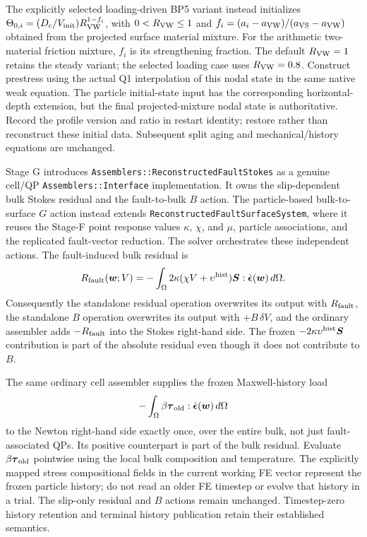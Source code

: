 \documentclass[11pt]{article}
\begin{document}
The explicitly selected loading-driven BP5 variant instead initializes
$\Theta_{0,i}=(D_c/V_{\rm init})R_{\rm VW}^{1-f_i}$, with $0<R_{\rm VW}\leq1$
and $f_i=(a_i-a_{\rm VW})/(a_{\rm VS}-a_{\rm VW})$ obtained from the projected
surface material mixture. For the arithmetic two-material friction mixture,
$f_i$ is its strengthening fraction. The default $R_{\rm VW}=1$ retains the
steady variant; the selected loading case uses $R_{\rm VW}=0.8$.
Construct prestress using the actual Q1 interpolation of this nodal state in
the same native weak equation. The particle initial-state input has the
corresponding horizontal-depth extension, but the final projected-mixture
nodal state is authoritative. Record the profile version and ratio in restart
identity; restore rather than reconstruct these initial data. Subsequent
split aging and mechanical/history equations are unchanged.

Stage G introduces \texttt{Assemblers::ReconstructedFaultStokes} as a genuine
cell/QP \texttt{Assemblers::Interface} implementation.  It owns the
slip-dependent bulk Stokes residual and the fault-to-bulk $B$ action.  The
particle-based bulk-to-surface $G$ action instead extends
\texttt{ReconstructedFaultSurfaceSystem}, where it reuses the Stage-F point
response values $\kappa$, $\chi$, and $\mu$, particle associations, and the
replicated fault-vector reduction.  The solver orchestrates these independent
actions.  The fault-induced bulk residual is
\begin{equation}
 R_{\rm fault}(\boldsymbol w;V)
 =-\int_\Omega 2\kappa(\chi V+\upsilon^{\rm hist})
   \boldsymbol S:\dot{\boldsymbol\epsilon}(\boldsymbol w)\,d\Omega.
\end{equation}
Consequently the standalone residual operation overwrites its output with
$R_{\rm fault}$, the standalone $B$ operation overwrites its output with
$+B\,\delta V$, and the ordinary assembler adds $-R_{\rm fault}$ into the
Stokes right-hand side.  The frozen
$-2\kappa\upsilon^{\rm hist}\boldsymbol S$ contribution is part of the
absolute residual even though it does not contribute to $B$.

The same ordinary cell assembler supplies the frozen Maxwell-history load
\[
 -\int_\Omega \beta\boldsymbol\tau_{\rm old}:
       \dot{\boldsymbol\epsilon}(\boldsymbol w)\,d\Omega
\]
to the Newton right-hand side exactly once, over the entire bulk, not just
fault-associated QPs. Its positive counterpart is part of the bulk residual.
Evaluate $\beta\boldsymbol\tau_{\rm old}$ pointwise using the local bulk
composition and temperature. The explicitly mapped stress compositional
fields in the current working FE vector represent the frozen particle
history; do not read an older FE timestep or evolve that history in a trial.
The slip-only residual and $B$ actions remain unchanged. Timestep-zero history
retention and terminal history publication retain their established semantics.
\end{document}

